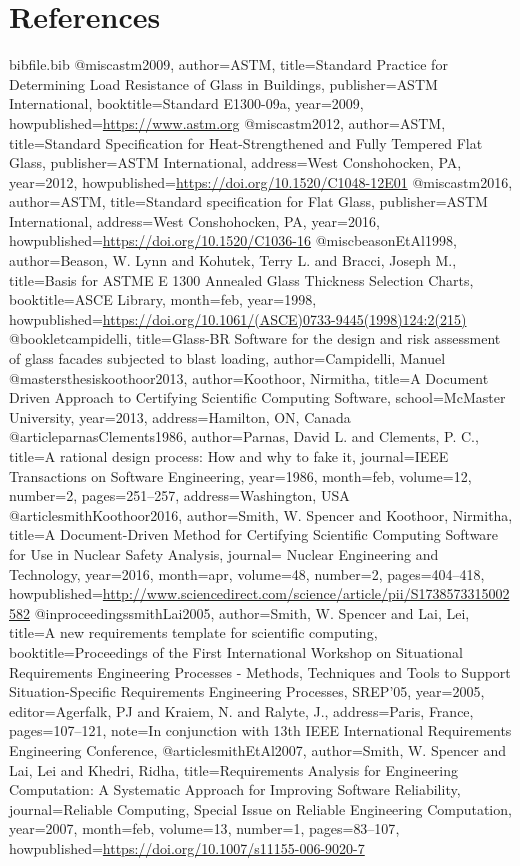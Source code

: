 \documentclass[12pt]{article}
\begin{document}
\section{References}
\label{Sec:References}
\begin{filecontents*}{bibfile.bib}
@misc{astm2009,
author={ASTM},
title={Standard Practice for Determining Load Resistance of Glass in Buildings},
publisher={ASTM International},
booktitle={Standard E1300-09a},
year={2009},
howpublished={\url{https://www.astm.org}}}
@misc{astm2012,
author={ASTM},
title={Standard Specification for Heat-Strengthened and Fully Tempered Flat Glass},
publisher={ASTM International},
address={West Conshohocken, PA},
year={2012},
howpublished={\url{https://doi.org/10.1520/C1048-12E01}}}
@misc{astm2016,
author={ASTM},
title={Standard specification for Flat Glass},
publisher={ASTM International},
address={West Conshohocken, PA},
year={2016},
howpublished={\url{https://doi.org/10.1520/C1036-16}}}
@misc{beasonEtAl1998,
author={Beason, W. Lynn and Kohutek, Terry L. and Bracci, Joseph M.},
title={Basis for ASTME E 1300 Annealed Glass Thickness Selection Charts},
booktitle={ASCE Library},
month=feb,
year={1998},
howpublished={\url{https://doi.org/10.1061/(ASCE)0733-9445(1998)124:2(215)}}}
@booklet{campidelli,
title={Glass-BR Software for the design and risk assessment of glass facades subjected to blast loading},
author={Campidelli, Manuel}}
@mastersthesis{koothoor2013,
author={Koothoor, Nirmitha},
title={A Document Driven Approach to Certifying Scientific Computing Software},
school={McMaster University},
year={2013},
address={Hamilton, ON, Canada}}
@article{parnasClements1986,
author={Parnas, David L. and Clements, P. C.},
title={A rational design process: How and why to fake it},
journal={IEEE Transactions on Software Engineering},
year={1986},
month=feb,
volume={12},
number={2},
pages={251--257},
address={Washington, USA}}
@article{smithKoothoor2016,
author={Smith, W. Spencer and Koothoor, Nirmitha},
title={A Document-Driven Method for Certifying Scientific Computing Software for Use in Nuclear Safety Analysis},
journal={ Nuclear Engineering and Technology},
year={2016},
month=apr,
volume={48},
number={2},
pages={404--418},
howpublished={\url{http://www.sciencedirect.com/science/article/pii/S1738573315002582}}}
@inproceedings{smithLai2005,
author={Smith, W. Spencer and Lai, Lei},
title={A new requirements template for scientific computing},
booktitle={Proceedings of the First International Workshop on Situational Requirements Engineering Processes - Methods, Techniques and Tools to Support Situation-Specific Requirements Engineering Processes, SREP'05},
year={2005},
editor={Agerfalk, PJ and Kraiem, N. and Ralyte, J.},
address={Paris, France},
pages={107--121},
note={In conjunction with 13th IEEE International Requirements Engineering Conference,}}
@article{smithEtAl2007,
author={Smith, W. Spencer and Lai, Lei and Khedri, Ridha},
title={Requirements Analysis for Engineering Computation: A Systematic Approach for Improving Software Reliability},
journal={Reliable Computing, Special Issue on Reliable Engineering Computation},
year={2007},
month=feb,
volume={13},
number={1},
pages={83--107},
howpublished={\url{https://doi.org/10.1007/s11155-006-9020-7}}}
\end{filecontents*}
\nocite{*}
\printbibliography[heading=none]
\end{document}

